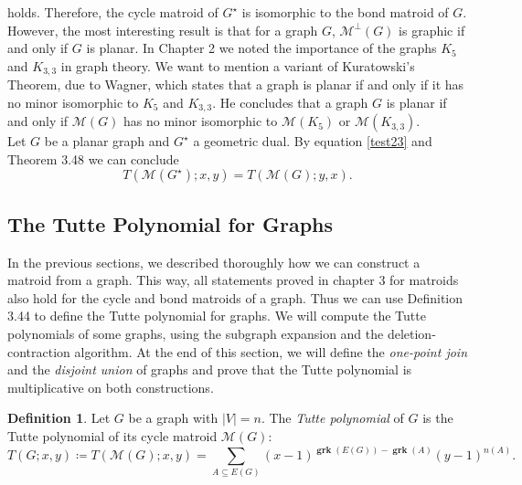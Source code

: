 \documentclass[12pt,a4paper, twoside, autooneside=false]{scrartcl}
\theoremstyle{definition}
\newtheorem{definition}[theorem]{Definition}
\theoremstyle{remark}
\numberwithin{equation}{section}
\newcommand{\M}{\mathcal{M}} %
\DeclareMathOperator{\grk}{\mathbf{grk}} %
\begin{document}
holds. Therefore, the cycle matroid of $G^\star$ is isomorphic to the bond matroid of $G$. However, the most interesting result is that for a graph $G$, $\M^\perp(G)$ is graphic if and only if $G$ is planar. In Chapter 2 we noted the importance of the graphs $K_5$ and $K_{3,3}$ in graph theory. We want to mention a variant of Kuratowski's Theorem, due to Wagner, which states that a graph is planar if and only if it has no minor isomorphic to $K_5$ and $K_{3,3}$. He concludes that a graph $G$ is planar if and only if $\M(G)$ has no minor isomorphic to $\M(K_5)$ or $\M(K_{3,3})$. \\
\indent 
Let $G$ be a planar graph and $G^\star$ a geometric dual. By equation \eqref{test23} and Theorem 3.48 we can conclude 
\[
T(\M(G^\star);x,y) = T(\M(G);y,x).
\]
\subsection{The Tutte Polynomial for Graphs}
In the previous sections, we described thoroughly how we can construct a matroid from a graph. This way, all statements proved in chapter 3 for matroids also hold for the cycle and bond matroids of a graph. Thus we can use Definition 3.44 to define the Tutte polynomial for graphs. We will compute the Tutte polynomials of some graphs, using the subgraph expansion and the deletion-contraction algorithm. At the end of this section, we will define the \textit{one-point join} and the \textit{disjoint union} of graphs and prove that the Tutte polynomial is multiplicative on both constructions.
\begin{definition}
Let $G$ be a graph with $|V| = n$. The \textit{Tutte polynomial} of $G$ is the Tutte polynomial of its cycle matroid $\M(G)$:
\[
T(G;x,y) \coloneqq T(\M(G);x,y) = \sum_{A \subseteq E(G)} (x - 1)^{\grk(E(G)) - \grk(A)} (y - 1)^{n(A)}.
\]
\end{definition}
\end{document}

